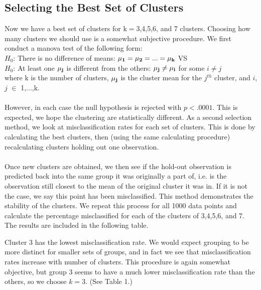 \documentclass[11pt]{article}
\begin{document}
\subsection*{Selecting the Best Set of Clusters}
Now we have a best set of clusters for k$=$3,4,5,6, and 7 clusters. Choosing how
many clusters we should use is a somewhat subjective procedure. We first conduct
a manova test of the following form: 
\\
\indent $H_0$: There is no difference of means: 
               $\bf{\mu}_{1} = \bf{\mu}_{2} = ... = \bf{\mu}_{k}$ VS 
\\
\indent $H_0$: At least one $\bf{\mu}_{j}$ is different from the others: 
               $\bf{\mu}_{j} \ne \bf{\mu}_{i}$ for some $i \ne j$
\\
where k is the number of clusters, $\bf{\mu}_{j}$ is the cluster mean 
for the $j^{th}$ cluster, and $i$, $j$ $\in$ 1,...,k.
\\
\\ 
However, in each case the null hypothesis is rejected with $p<.0001$. This is
expected, we hope the clustering are statistically different. As a second
selection method, we look at misclassification rates for each set of clusters.
This is done by calculating the best clusters, then (using the same calculating
procedure) recalculating clusters holding out one observation. 
\\
\\
Once new clusters are obtained, we then see if the hold-out observation is
predicted back into the same group it was originally a part of, i.e. is the
observation still closest to the mean of the original cluster it was in. If it
is not the case, we say this point has been misclassified. This method
demonstrates the stability of the clusters. We repeat this process for all 1000
data points and calculate the percentage misclassified for each of the clusters
of 3,4,5,6, and 7. The results are included in the following table.


\noindent Cluster 3 has the lowest misclassification rate. We would expect
grouping to be more distinct for smaller sets of groups, and in fact we see that
misclassification rates increase with number of clusters. This procedure is
again somewhat objective, but group 3 seems to have a much lower
misclassification rate than the others, so we choose $k=3$. (See Table 1.)

\end{document}
